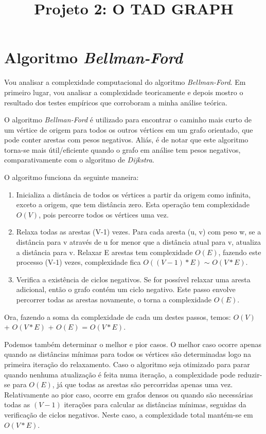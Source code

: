 \documentclass[code,math]{relatorio-deti}
\title{Projeto 2: O TAD GRAPH}
\begin{document}
\maketitle

\tableofcontents
\clearpage

\setcounter{page}{1}

\chapter{Algoritmo \textit{Bellman-Ford}}

Vou analisar a complexidade computacional do algoritmo \textit{Bellman-Ford}. Em primeiro lugar, vou analisar a complexidade teoricamente e depois mostro o resultado dos testes empíricos que corroboram a minha análise teórica.

O algoritmo \textit{Bellman-Ford} é utilizado para encontrar o caminho mais curto de um vértice de origem para todos os outros vértices em um grafo orientado, que pode conter arestas com pesos negativos. Aliás, é de notar que este algoritmo torna-se mais útil/eficiente quando o grafo em análise tem pesos negativos, comparativamente com o algoritmo de \textit{Dijkstra}.

O algoritmo funciona da seguinte maneira:
\begin{enumerate}
    \item Inicializa a distância de todos os vértices a partir da origem como infinita, exceto a origem, que tem distância zero. Esta operação tem complexidade $O(V)$, pois percorre todos os vértices uma vez.
    \item Relaxa todas as arestas (V-1) vezes. Para cada aresta (u, v) com peso w, se a distância para v através de u for menor que a distância atual para v, atualiza a distância para v. Relaxar E arestas tem complexidade $O(E)$, fazendo este processo (V-1) vezes, complexidade fica $O((V-1)*E)$ $\sim$ $O(V*E)$.
    \item Verifica a existência de ciclos negativos. Se for possível relaxar uma aresta adicional, então o grafo contém um ciclo negativo. Este passo envolve percorrer todas as arestas novamente, o torna a complexidade $O(E)$.
\end{enumerate}

Ora, fazendo a soma da complexidade de cada um destes passos, temos: $O(V)$ + $O(V*E)$ + $O(E)$ = $O(V*E)$.

Podemos também determinar o melhor e pior casos. O melhor caso ocorre apenas quando as distâncias mínimas para todos os vértices são determinadas logo na primeira iteração do relaxamento. Caso o algoritmo seja otimizado para parar quando nenhuma atualização é feita numa iteração, a complexidade pode reduzir-se para $O(E)$, já que todas as arestas são percorridas apenas uma vez. Relativamente ao pior caso, ocorre em grafos densos ou quando são necessárias todas as $(V-1)$ iterações para calcular as distâncias mínimas, seguidas da verificação de ciclos negativos. Neste caso, a complexidade total mantém-se em $O(V*E)$.
\end{document}
